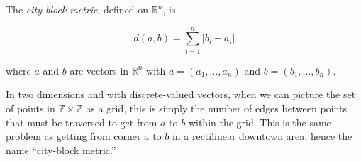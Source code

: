 \documentclass[12pt]{article}
\begin{document}
The \emph{city-block metric}, defined on $\mathbb{R}^n$, is

$$ d(a,b) = \sum_{i=1}^n |b_i-a_i| $$

where $a$ and $b$ are vectors in $\mathbb{R}^n$ with $a=(a_1,\ldots,a_n)$ and $b=(b_1,\ldots,b_n)$.

In two dimensions and with discrete-valued vectors, when we can picture the set of points in $\mathbb{Z} \times \mathbb{Z}$ as a grid, this is simply the number of edges between points that must be traversed to get from $a$ to $b$ within the grid.  This is the same problem as getting from corner $a$ to $b$ in a rectilinear downtown area, hence the name ``city-block metric.''
\end{document}
